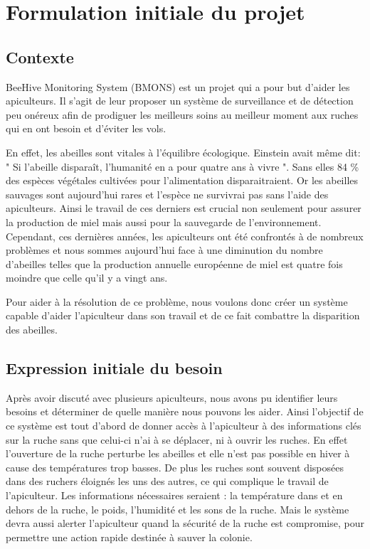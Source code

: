 \chapter{Formulation initiale du projet}



\section{Contexte}

BeeHive Monitoring System (BMONS) est un projet qui a pour but d'aider les apiculteurs. Il s'agit de leur proposer un système de surveillance et de détection peu onéreux afin de prodiguer les meilleurs soins au meilleur moment aux ruches qui en ont besoin et d'éviter les vols.

En effet, les abeilles sont vitales à l'équilibre écologique. Einstein avait même dit: " Si l’abeille disparaît, l’humanité en a pour quatre ans à vivre ". Sans elles 84 \% des espèces végétales cultivées pour l'alimentation disparaitraient. Or les abeilles sauvages sont aujourd'hui rares et l'espèce ne survivrai pas sans l'aide des apiculteurs. Ainsi le travail de ces derniers est crucial non seulement pour assurer la production de miel mais aussi pour la sauvegarde de l'environnement. Cependant, ces dernières années, les apiculteurs ont été confrontés à de nombreux problèmes et nous sommes aujourd'hui face à une diminution du nombre d'abeilles telles que la production annuelle européenne de miel est quatre fois moindre que celle qu'il y a vingt ans. 

Pour aider à la résolution de ce problème, nous voulons donc créer un système capable d'aider l'apiculteur dans son travail et de ce fait combattre la disparition des abeilles. 

\section{Expression initiale du besoin}

Après avoir discuté avec plusieurs apiculteurs, nous avons pu identifier leurs besoins et déterminer de quelle manière nous pouvons les aider. Ainsi l'objectif de ce système est tout d'abord de donner accès à l'apiculteur à des informations clés sur la ruche sans que celui-ci n'ai à se déplacer, ni à ouvrir les ruches. En effet l'ouverture de la ruche perturbe les abeilles et elle n'est pas possible en hiver à cause des températures trop basses. De plus les ruches sont souvent disposées dans des ruchers éloignés les uns des autres, ce qui complique le travail de l'apiculteur. Les informations nécessaires seraient : la température dans et en dehors de la ruche, le poids, l'humidité et les sons de la ruche. Mais le système devra aussi alerter l'apiculteur quand la sécurité de la ruche est compromise, pour permettre une action rapide destinée à sauver la colonie.

